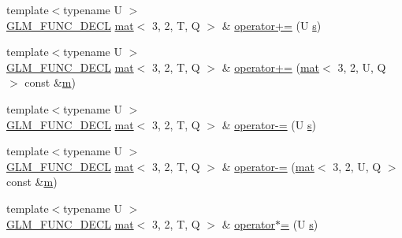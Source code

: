 \begin{DoxyCompactItemize}
\item 
{\footnotesize template$<$typename U $>$ }\\\mbox{\hyperlink{setup_8hpp_ab2d052de21a70539923e9bcbf6e83a51}{G\+L\+M\+\_\+\+F\+U\+N\+C\+\_\+\+D\+E\+CL}} \mbox{\hyperlink{structglm_1_1mat}{mat}}$<$ 3, 2, T, Q $>$ \& \mbox{\hyperlink{structglm_1_1mat_3_013_00_012_00_01_t_00_01_q_01_4_a2f7849a67991389dab2de4945f67f1f9}{operator+=}} (U \mbox{\hyperlink{_s_d_l__opengl_8h_a4af680a6c683f88ed67b76f207f2e6e4}{s}})
\item 
{\footnotesize template$<$typename U $>$ }\\\mbox{\hyperlink{setup_8hpp_ab2d052de21a70539923e9bcbf6e83a51}{G\+L\+M\+\_\+\+F\+U\+N\+C\+\_\+\+D\+E\+CL}} \mbox{\hyperlink{structglm_1_1mat}{mat}}$<$ 3, 2, T, Q $>$ \& \mbox{\hyperlink{structglm_1_1mat_3_013_00_012_00_01_t_00_01_q_01_4_abf135c2584e5a5fcdaff6488d353d0fe}{operator+=}} (\mbox{\hyperlink{structglm_1_1mat}{mat}}$<$ 3, 2, U, Q $>$ const \&\mbox{\hyperlink{_s_d_l__opengl__glext_8h_af593500c283bf1a787a6f947f503a5c2}{m}})
\item 
{\footnotesize template$<$typename U $>$ }\\\mbox{\hyperlink{setup_8hpp_ab2d052de21a70539923e9bcbf6e83a51}{G\+L\+M\+\_\+\+F\+U\+N\+C\+\_\+\+D\+E\+CL}} \mbox{\hyperlink{structglm_1_1mat}{mat}}$<$ 3, 2, T, Q $>$ \& \mbox{\hyperlink{structglm_1_1mat_3_013_00_012_00_01_t_00_01_q_01_4_a0ab9b96cc625abbf3ecec33240d5db7e}{operator-\/=}} (U \mbox{\hyperlink{_s_d_l__opengl_8h_a4af680a6c683f88ed67b76f207f2e6e4}{s}})
\item 
{\footnotesize template$<$typename U $>$ }\\\mbox{\hyperlink{setup_8hpp_ab2d052de21a70539923e9bcbf6e83a51}{G\+L\+M\+\_\+\+F\+U\+N\+C\+\_\+\+D\+E\+CL}} \mbox{\hyperlink{structglm_1_1mat}{mat}}$<$ 3, 2, T, Q $>$ \& \mbox{\hyperlink{structglm_1_1mat_3_013_00_012_00_01_t_00_01_q_01_4_a5f0d9bcf7905c11160d68dbb173b1f19}{operator-\/=}} (\mbox{\hyperlink{structglm_1_1mat}{mat}}$<$ 3, 2, U, Q $>$ const \&\mbox{\hyperlink{_s_d_l__opengl__glext_8h_af593500c283bf1a787a6f947f503a5c2}{m}})
\item 
{\footnotesize template$<$typename U $>$ }\\\mbox{\hyperlink{setup_8hpp_ab2d052de21a70539923e9bcbf6e83a51}{G\+L\+M\+\_\+\+F\+U\+N\+C\+\_\+\+D\+E\+CL}} \mbox{\hyperlink{structglm_1_1mat}{mat}}$<$ 3, 2, T, Q $>$ \& \mbox{\hyperlink{structglm_1_1mat_3_013_00_012_00_01_t_00_01_q_01_4_a10c3599e06deb91b06f2f55fb9b6fe3f}{operator$\ast$=}} (U \mbox{\hyperlink{_s_d_l__opengl_8h_a4af680a6c683f88ed67b76f207f2e6e4}{s}})

\end{DoxyCompactItemize}
